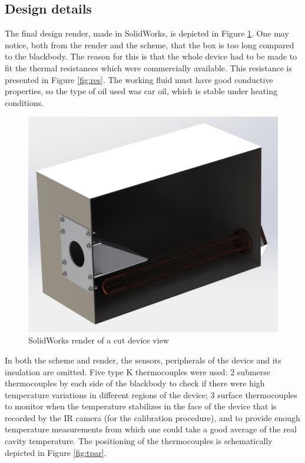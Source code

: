 \subsection{Design details}
\par The final design render, made in SolidWorks, is depicted in Figure \ref{fig:render}. One may notice, both from the render and the scheme, that the box is too long compared to the blackbody. The reason for this is that the whole device had to be made to fit the thermal resistances which were commercially available. This resistance is presented in Figure \ref{fig:res}. The working fluid must have good conductive properties, so the type of oil used was car oil, which is stable under heating conditions. \\

\begin{figure}[h]
\centering
\includegraphics[width=0.8\linewidth]{Figures/4.Chapter/caixa_render.PNG}
\caption{SolidWorks render of a cut device view}
\label{fig:render}
\end{figure}

\par In both the scheme and render, the sensors, peripherals of the device and its insulation are omitted. Five type K thermocouples were used: 2 submerse thermocouples by each side of the blackbody to check if there were high temperature variations in different regions of the device; 3 surface thermocouples to monitor when the temperature stabilizes in the face of the device that is recorded by the IR camera (for the calibration procedure), and to provide enough temperature measurements from which one could take a good average of the real cavity temperature. The positioning of the thermocouples is schematically depicted in Figure \ref{fig:tpar}. \\

